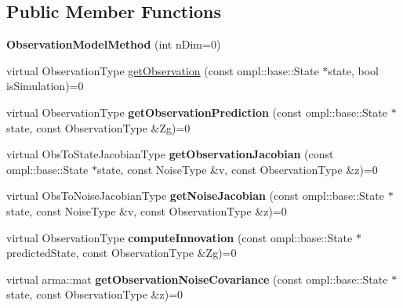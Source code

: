\subsection*{\-Public \-Member \-Functions}
\begin{DoxyCompactItemize}
\item 
\hypertarget{class_observation_model_method_ace82963106629ded581fd8b43c4a0a6b}{{\bfseries \-Observation\-Model\-Method} (int n\-Dim=0)}\label{class_observation_model_method_ace82963106629ded581fd8b43c4a0a6b}

\item 
virtual \-Observation\-Type \hyperlink{class_observation_model_method_af1a30aad975576ae8f16042a8ee8276b}{get\-Observation} (const ompl\-::base\-::\-State $\ast$state, bool is\-Simulation)=0
\item 
\hypertarget{class_observation_model_method_a9d10ee1be836ef4d406c85b35efd72d8}{virtual \-Observation\-Type {\bfseries get\-Observation\-Prediction} (const ompl\-::base\-::\-State $\ast$state, const \-Observation\-Type \&\-Zg)=0}\label{class_observation_model_method_a9d10ee1be836ef4d406c85b35efd72d8}

\item 
\hypertarget{class_observation_model_method_acd2e16185fbfd1c25b22b77e52acc936}{virtual \-Obs\-To\-State\-Jacobian\-Type {\bfseries get\-Observation\-Jacobian} (const ompl\-::base\-::\-State $\ast$state, const \-Noise\-Type \&v, const \-Observation\-Type \&z)=0}\label{class_observation_model_method_acd2e16185fbfd1c25b22b77e52acc936}

\item 
\hypertarget{class_observation_model_method_af53dcf93c40fd8589e84a3cfe48a0c7e}{virtual \-Obs\-To\-Noise\-Jacobian\-Type {\bfseries get\-Noise\-Jacobian} (const ompl\-::base\-::\-State $\ast$state, const \-Noise\-Type \&v, const \-Observation\-Type \&z)=0}\label{class_observation_model_method_af53dcf93c40fd8589e84a3cfe48a0c7e}

\item 
\hypertarget{class_observation_model_method_a359c3b1473a12dcbaa73f7e63d7cf202}{virtual \-Observation\-Type {\bfseries compute\-Innovation} (const ompl\-::base\-::\-State $\ast$predicted\-State, const \-Observation\-Type \&\-Zg)=0}\label{class_observation_model_method_a359c3b1473a12dcbaa73f7e63d7cf202}

\item 
\hypertarget{class_observation_model_method_af0ef30992e4ecd8adc81bed96e6d6663}{virtual arma\-::mat {\bfseries get\-Observation\-Noise\-Covariance} (const ompl\-::base\-::\-State $\ast$state, const \-Observation\-Type \&z)=0}\label{class_observation_model_method_af0ef30992e4ecd8adc81bed96e6d6663}


\end{DoxyCompactItemize}
